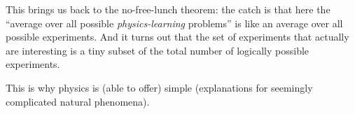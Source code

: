 \documentclass[12pt]{article}
\begin{document}
This brings us back to the no-free-lunch theorem: the catch is that here the ``average over all possible \emph{physics-learning} problems'' is like an average over all possible experiments. And it turns out that the set of experiments that 
 actually are interesting is a tiny subset of the total number of logically possible experiments. 

 This is why physics is (able to offer) simple (explanations for seemingly 
 complicated natural phenomena).
\end{document}
